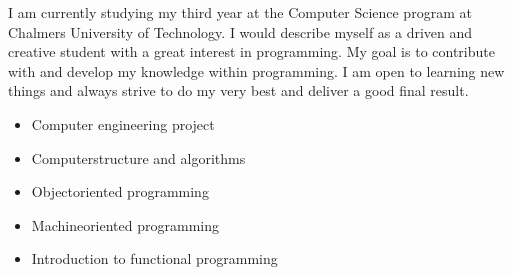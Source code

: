 I am currently studying my third year at the Computer Science program at Chalmers University 
of Technology. I would describe myself as a driven and creative student with a great interest 
in programming. My goal is to contribute with and develop my knowledge within programming. 
I am open to learning new things and always strive to do my very best and deliver a good final result.


\begin{itemize}
    \item Computer engineering project
    \item Computerstructure and algorithms
    \item Objectoriented programming
    \item Machineoriented programming
    \item Introduction to functional programming
\end{itemize}








